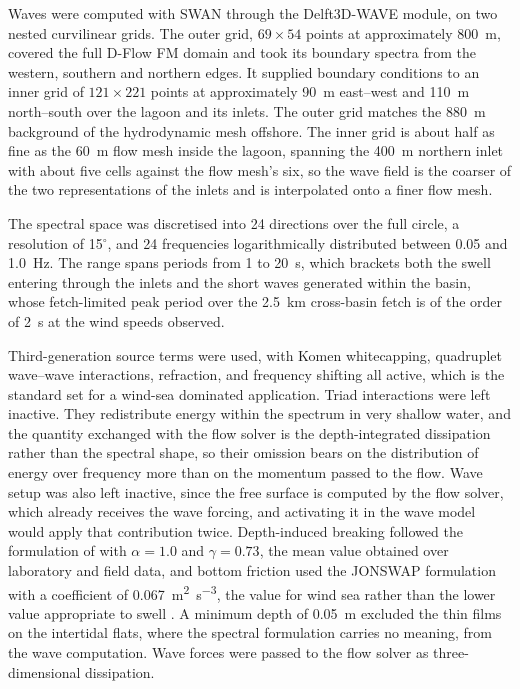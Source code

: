 Waves were computed with SWAN \citep{Booij1999} through the Delft3D-WAVE
module, on two nested curvilinear grids. The outer grid, $69 \times 54$ points
at approximately 800~m, covered the full D-Flow FM domain and took its
boundary spectra from the western, southern and northern edges. It supplied
boundary conditions to an inner grid of $121 \times 221$ points at
approximately 90~m east--west and 110~m north--south over the lagoon and its
inlets. The outer grid matches the 880~m background of the hydrodynamic mesh
offshore. The inner grid is about half as fine as the 60~m flow mesh inside
the lagoon, spanning the 400~m northern inlet with about five cells against
the flow mesh's six, so the wave field is the coarser of the two
representations of the inlets and is interpolated onto a finer flow mesh.

The spectral space was discretised into 24 directions over the full circle,
a resolution of 15$^\circ$, and 24 frequencies logarithmically distributed
between 0.05 and 1.0~Hz. The range spans periods from 1 to 20~s, which brackets
both the swell entering through the inlets and the short waves generated
within the basin, whose fetch-limited peak period over the 2.5~km cross-basin
fetch is of the order of 2~s at the wind speeds observed.

Third-generation source terms were used, with Komen whitecapping,
quadruplet wave--wave interactions, refraction, and frequency shifting all
active, which is the standard set for a wind-sea dominated application.
Triad interactions were left inactive. They redistribute energy within the
spectrum in very shallow water, and the quantity exchanged with the flow
solver is the depth-integrated dissipation rather than the spectral shape, so
their omission bears on the distribution of energy over frequency more than on
the momentum passed to the flow. Wave setup was also left inactive, since the
free surface is computed by the flow solver, which already receives the wave
forcing, and activating it in the wave model would apply that contribution
twice. Depth-induced breaking followed the formulation of
\citet{BattjesJanssen1978} with $\alpha = 1.0$ and $\gamma = 0.73$, the mean
value \citet{BattjesStive1985} obtained over laboratory and field data, and
bottom friction used the JONSWAP formulation with a coefficient of
0.067~\si{\metre\squared\per\cubic\second}, the value for wind sea rather
than the lower value appropriate to swell \citep{BouwsKomen1983}. A minimum
depth of 0.05~m excluded the thin films on the intertidal flats, where the
spectral formulation carries no meaning, from the wave computation. Wave
forces were passed to the flow solver as three-dimensional dissipation.


